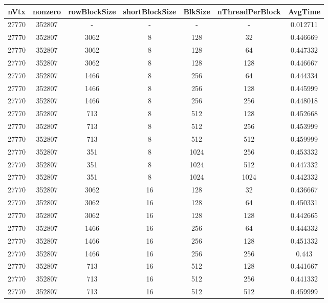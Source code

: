 \documentclass[9pt]{article}
\begin{document}
\SetBgPosition{0.25cm,-5.0cm}
\begin{tabular}{|c|c|c|c|c|c|c| }  
\hline
nVtx  & nonzero  & rowBlockSize  & shortBlockSize  & BlkSize  & nThreadPerBlock  & AvgTime \\
\hline
27770  & 352807  &  -  & -  & -  & -  &0.012711 \\
\hline
27770  & 352807  & 3062  & 8  & 128  & 32  & 0.446669 \\
\hline
27770  & 352807  & 3062  & 8  & 128  & 64  & 0.447332 \\
\hline
27770  & 352807  & 3062  & 8  & 128  & 128  & 0.446667 \\
\hline
27770  & 352807  & 1466  & 8  & 256  & 64  & 0.444334 \\
\hline
27770  & 352807  & 1466  & 8  & 256  & 128  & 0.445999 \\
\hline
27770  & 352807  & 1466  & 8  & 256  & 256  & 0.448018 \\
\hline
27770  & 352807  & 713  & 8  & 512  & 128  & 0.452668 \\
\hline
27770  & 352807  & 713  & 8  & 512  & 256  & 0.453999 \\
\hline
27770  & 352807  & 713  & 8  & 512  & 512  & 0.459999 \\
\hline
27770  & 352807  & 351  & 8  & 1024  & 256  & 0.453332 \\
\hline
27770  & 352807  & 351  & 8  & 1024  & 512  & 0.447332 \\
\hline
27770  & 352807  & 351  & 8  & 1024  & 1024  & 0.442332 \\
\hline
27770  & 352807  & 3062  & 16  & 128  & 32  & 0.436667 \\
\hline
27770  & 352807  & 3062  & 16  & 128  & 64  & 0.450331 \\
\hline
27770  & 352807  & 3062  & 16  & 128  & 128  & 0.442665 \\
\hline
27770  & 352807  & 1466  & 16  & 256  & 64  & 0.444332 \\
\hline
27770  & 352807  & 1466  & 16  & 256  & 128  & 0.451332 \\
\hline
27770  & 352807  & 1466  & 16  & 256  & 256  & 0.443 \\
\hline
27770  & 352807  & 713  & 16  & 512  & 128  & 0.441667 \\
\hline
27770  & 352807  & 713  & 16  & 512  & 256  & 0.441332 \\
\hline
27770  & 352807  & 713  & 16  & 512  & 512  & 0.459999 \\

\end{tabular}
\end{document}
